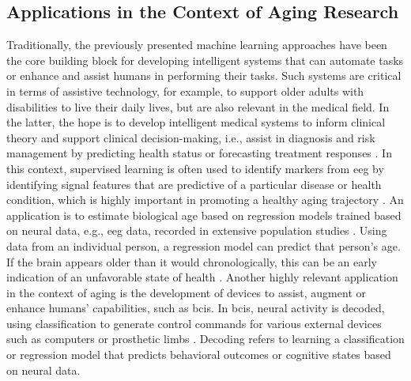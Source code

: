 \subsection{Applications in the Context of Aging Research}
\label{theory:ml:applications_aging}
Traditionally, the previously presented machine learning approaches have been the core building block for developing intelligent systems that can automate tasks or enhance and assist humans in performing their tasks. Such systems are critical in terms of assistive technology, for example, to support older adults with disabilities to live their daily lives, but are also relevant in the medical field. In the latter, the hope is to develop intelligent medical systems to inform clinical theory and support clinical decision-making, i.e., assist in diagnosis and risk management by predicting health status or forecasting treatment responses \cite{Woo2017}. In this context, supervised learning is often used to identify markers from \gls{eeg} by identifying signal features that are predictive of a particular disease or health condition, which is highly important in promoting a healthy aging trajectory \cite{Babiloni2021,Mei2021}. An application is to estimate biological age based on regression models trained based on neural data, e.g., \gls{eeg} data, recorded in extensive population studies \cite{Engemann2022}. Using data from an individual person, a regression model can predict that person's age. If the brain appears older than it would chronologically, this can be an early indication of an unfavorable state of health \cite{Gonneaud2021}. Another highly relevant application in the context of aging is the development of devices to assist, augment or enhance humans' capabilities, such as \glspl{bci}. In \glspl{bci}, neural activity is decoded, using classification to generate control commands for various external devices such as computers or prosthetic limbs \cite{Saha2021, Anumanchipalli2019}. Decoding refers to learning a classification or regression model that predicts behavioral outcomes or cognitive states based on neural data. \\
\\
